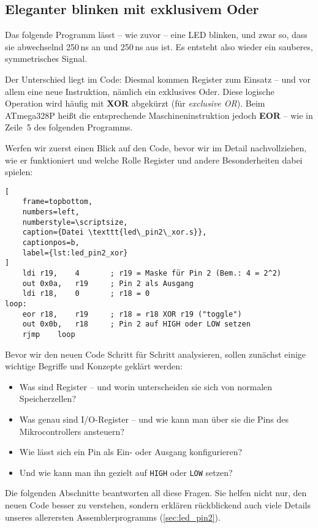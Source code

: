 \documentclass[a4paper,12pt]{article}
\begin{document}
\newpage
\subsection{Eleganter blinken mit exklusivem Oder}

Das folgende Programm lässt – wie zuvor – eine LED blinken, und zwar so, dass
sie abwechselnd 250\,ns an und 250\,ns aus ist. Es entsteht also wieder ein
sauberes, symmetrisches Signal.

Der Unterschied liegt im Code: Diesmal kommen Register zum Einsatz – und vor
allem eine neue Instruktion, nämlich ein exklusives Oder. Diese logische
Operation wird häufig mit \textbf{XOR} abgekürzt (für \emph{exclusive OR}).
Beim ATmega328P heißt die entsprechende Maschineninstruktion jedoch
\textbf{EOR} – wie in Zeile~5 des folgenden Programms.

Werfen wir zuerst einen Blick auf den Code, bevor wir im Detail nachvollziehen,
wie er funktioniert und welche Rolle Register und andere Besonderheiten dabei
spielen:

\begin{lstlisting}[
    frame=topbottom,
    numbers=left,
    numberstyle=\scriptsize,
    caption={Datei \texttt{led\_pin2\_xor.s}},
    captionpos=b,
    label={lst:led_pin2_xor}
]
	ldi	r19,	4	    ; r19 = Maske für Pin 2 (Bem.: 4 = 2^2)
	out	0x0a,	r19	    ; Pin 2 als Ausgang
	ldi	r18,	0	    ; r18 = 0
loop:
	eor	r18,	r19	    ; r18 = r18 XOR r19 ("toggle")
	out	0x0b,	r18	    ; Pin 2 auf HIGH oder LOW setzen
	rjmp	loop
\end{lstlisting}


\medskip
\noindent
Bevor wir den neuen Code Schritt für Schritt analysieren, sollen zunächst
einige wichtige Begriffe und Konzepte geklärt werden:

\begin{itemize}
    \item
	Was sind Register – und worin unterscheiden sie sich von normalen
	Speicherzellen?
    \item
	Was genau sind I/O-Register – und wie kann man über sie die Pins des
	Mikrocontrollers ansteuern?
    \item
	Wie lässt sich ein Pin als Ein- oder Ausgang konfigurieren?
    \item
	Und wie kann man ihn gezielt auf \texttt{HIGH} oder \texttt{LOW}
	setzen?
\end{itemize}
\noindent
Die folgenden Abschnitte beantworten all diese Fragen. Sie helfen nicht nur,
den neuen Code besser zu verstehen, sondern erklären rückblickend auch viele
Details unseres allerersten Assemblerprogramms (\autoref{sec:led_pin2}).
\end{document}
